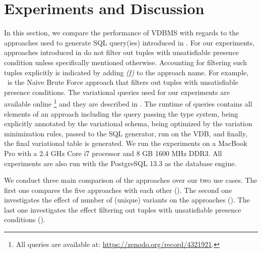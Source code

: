 \section{Experiments and Discussion}
\label{sec:exp}


In this section, we compare the performance of VDBMS with regards
to the approaches used to generate SQL query(ies) introduced in .
For our experiments, approaches introduced in  do not filter out 
tuples with unsatisfiable presence condition unless specifically mentioned otherwise.
Accounting for filtering such tuples explicitly is indicated by adding \emph{(f)} to
the approach name. For example, \nbff\ is the Naive Brute Force approach that 
filters out tuples with unsatisfiable presence conditions. 
%
The variational queries used for our experiments are available online
%
\footnote{All queries are available at: \url{https://zenodo.org/record/4321921}.}
and they are described in .
%
The runtime of queries contains all elements of an approach including the query
passing the type system, being explicitly annotated by the variational schema, 
being optimized by the variation minimization rules, passed to the SQL generator, 
run on the VDB, and finally, the final variational table is generated. 
%
We run the experiments on a MacBook Pro with a 2.4 GHz Core i7 processor and 
8 GB 1600 MHz DDR3. All experiments are also run with the PostgreSQL 13.3 as 
the database engine. 

We conduct three main 
comparison of the approaches over our two use cases. The first one 
compares the five approaches with each other (). The second one
investigates the effect of number of (unique) variants on the approaches (). 
The last one investigates the effect filtering out
tuples with unsatisfiable presence conditions (). 




